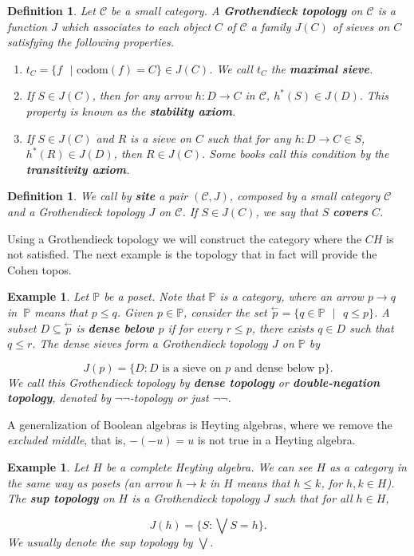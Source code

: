 \documentclass[10pt,longbibliography]{article}
\newtheorem{Def}[Theo]{Definition}
\newtheorem{Example}[Theo]{Example}
\newcommand{\C}{\mathcal{C}}
\newcommand{\Po}{\mathbb{P}}
\begin{document}
\begin{Def}
	Let $\C$ be a small category. A \textbf{Grothendieck topology} on $\C$ is a function $J$ which associates to each object $C$ of $\C$ a family $J(C)$ of sieves on $C$ satisfying the following properties.
	\begin{enumerate}
		\item $t_{C} = \{ f\text{ } | \text{  codom}(f) = C\} \in J(C)$. We call $t_{C}$ the \textbf{maximal sieve}.
		
		\item If $S \in J(C)$, then for any arrow $h: D \to C$ in $\C$, $h^{*}(S) \in J(D).$ This property is known as the \textbf{stability axiom}.
		
		\item If $S \in J(C)$ and $R$ is a sieve on $C$ such that for any $h: D \to C \in S$, $h^{*}(R) \in J(D)$, then $R \in J(C)$. Some books call this condition by the \textbf{transitivity axiom}. 
	\end{enumerate}
\end{Def}

\begin{Def}\label{Sitedef}
We call by \textbf{site} a pair $(\C,J)$, composed by a small category $\C$ and a Grothendieck topology $J$ on $\C$. If $S \in J(C)$, we say that $S$ \textbf{covers} $C$. 
\end{Def}

Using a Grothendieck topology we will construct the category where the $CH$ is not satisfied. The next example is the topology that in fact will provide the Cohen topos.

\begin{Example}
	Let $\Po$ be a poset. Note that $\Po$ is a category, where an arrow $p \to q$ in $~\Po$ means that $ p\leq q$. Given $p \in \Po$, consider the set $\overset{\leftarrow}{p} = \{q \in \Po\text{ } | \text{ }q \leq p\}$. A subset $D \subseteq \overset{\leftarrow}{p}$ is \textbf{dense below $p$} if for every $r \leq p$, there exists $q \in D$ such that $q \leq r$. The dense sieves form a Grothendieck topology $J$ on $\Po$ by
	
	$$J(p) = \{D : D \text{ is a sieve on } p \text{ and dense below p}\}. $$
	We call this Grothendieck topology by \textbf{dense topology} or \textbf{double-negation topology}, denoted by $\neg\neg$-topology or just $\neg\neg$.  
\end{Example}
 A generalization of Boolean algebras is Heyting algebras, where we remove the \emph{excluded middle}, that is, $-(-u) = u$ is not true in  a Heyting algebra.
\begin{Example}
	Let $H$ be a complete Heyting algebra. We can see $H$  as a category in the same way as posets (an arrow $h \to k$ in $H$ means that $h \leq k$, for $h,k \in H$). The \textbf{sup topology} on $H$ is a Grothendieck topology $J$ such that for all $h \in H$,
	
	$$J(h) = \{S: \bigvee  S = h\}.$$
We usually denote the sup topology by $\bigvee$.
\end{Example}
\end{document}
